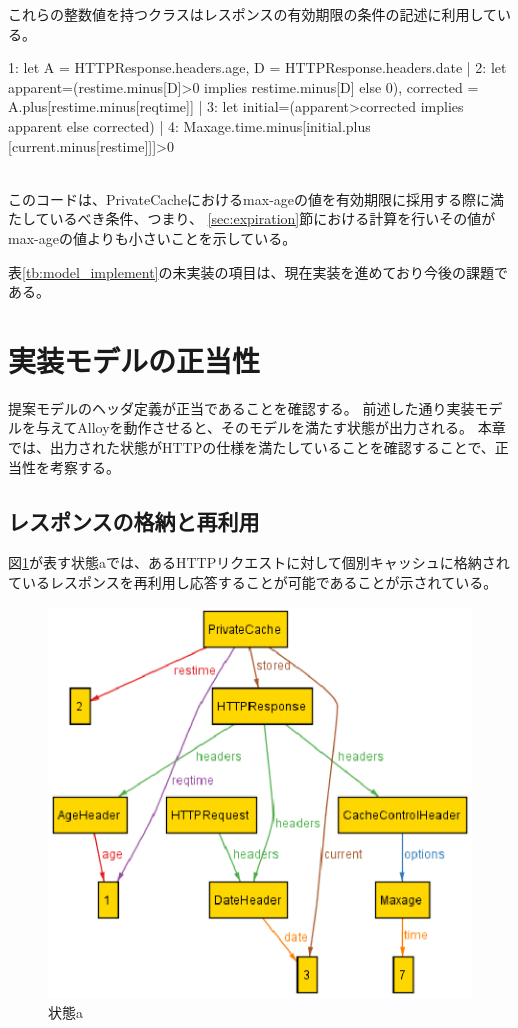 \documentclass{css}
\begin{document}
これらの整数値を持つクラスはレスポンスの有効期限の条件の記述に利用している。\\\hrulefill
\begin{small}
\begin{verbatimtab}[3]
1:	let A = HTTPResponse.headers.age, 
	D = HTTPResponse.headers.date |
2:		let apparent=(restime.minus[D]>0 implies
		restime.minus[D] else 0), corrected = 
		A.plus[restime.minus[reqtime]] | 
3:			let initial=(apparent>corrected 
			implies apparent else corrected) | 
4:				Maxage.time.minus[initial.plus
				[current.minus[restime]]]>0
\end{verbatimtab}
\end{small}
\hrulefill\\
このコードは、PrivateCacheにおけるmax-ageの値を有効期限に採用する際に満たしているべき条件、つまり、
\ref{sec:expiration}節における計算を行いその値がmax-ageの値よりも小さいことを示している。
\color{black}

\color{red}
表\ref{tb:model_implement}の未実装の項目は、現在実装を進めており今後の課題である。
\color{black}

\section{実装モデルの正当性}
提案モデルのヘッダ定義が正当であることを確認する。
前述した通り実装モデルを与えてAlloyを動作させると、そのモデルを満たす状態が出力される。
本章では、出力された状態がHTTPの仕様を満たしていることを確認することで、正当性を考察する。

\subsection{レスポンスの格納と再利用}
図\ref{fig:case1}が表す状態aでは、あるHTTPリクエストに対して個別キャッシュに格納されているレスポンスを再利用し応答することが可能であることが示されている。

\begin{figure}[htb]
\centering
\includegraphics[width=1.0\hsize]{case1.eps}
\caption{状態a}
\label{fig:case1}
\end{figure}
\end{document}
